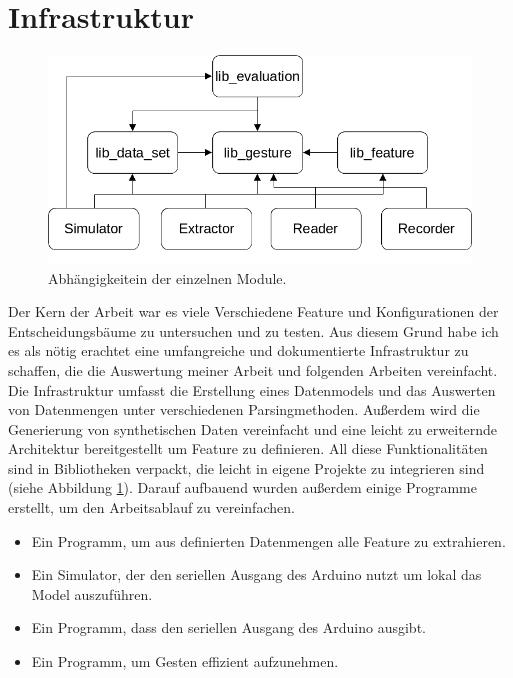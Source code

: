 \section{Infrastruktur}
\begin{figure}
    \centering
    \includegraphics[width=0.75\linewidth]{images/architecture_overview.jpg}
    \caption{Abhängigkeitein der einzelnen Module.}
    \label{fig:architecture_overview}
\end{figure}
Der Kern der Arbeit war es viele Verschiedene Feature und Konfigurationen der Entscheidungsbäume zu untersuchen und zu testen. Aus diesem Grund habe ich es als nötig erachtet eine umfangreiche und dokumentierte Infrastruktur
zu schaffen, die die Auswertung meiner Arbeit und folgenden Arbeiten vereinfacht. Die Infrastruktur umfasst die Erstellung eines Datenmodels und das Auswerten von Datenmengen unter verschiedenen Parsingmethoden.
Außerdem wird die Generierung von synthetischen Daten vereinfacht und eine leicht zu erweiternde Architektur bereitgestellt um Feature zu definieren. All diese Funktionalitäten sind in Bibliotheken verpackt,
die leicht in eigene Projekte zu integrieren sind (siehe Abbildung \ref{fig:architecture_overview}). Darauf aufbauend wurden außerdem einige Programme erstellt, um den Arbeitsablauf zu vereinfachen.
\begin{itemize}
    \item Ein Programm, um aus definierten Datenmengen alle Feature zu extrahieren.
    \item Ein Simulator, der den seriellen Ausgang des Arduino nutzt um lokal das Model auszuführen.
    \item Ein Programm, dass den seriellen Ausgang des Arduino ausgibt.
    \item Ein Programm, um Gesten effizient aufzunehmen.
\end{itemize}








